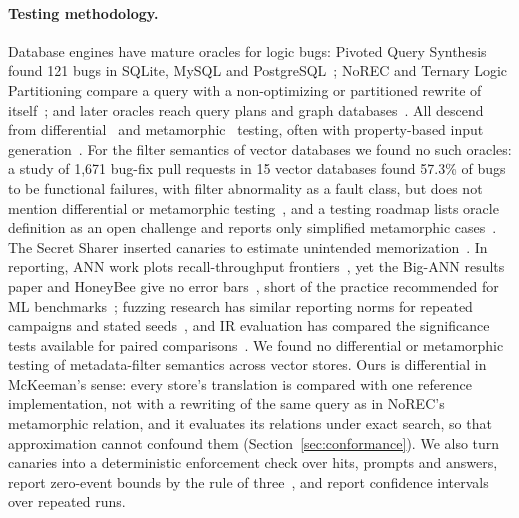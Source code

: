 \paragraph{Testing methodology.}
Database engines have mature oracles for logic bugs: Pivoted Query Synthesis found 121 bugs in
SQLite, MySQL and PostgreSQL~\cite{rigger2020testing}; NoREC and Ternary Logic Partitioning compare a
query with a non-optimizing or partitioned rewrite of itself~\cite{rigger2020detecting,rigger2020finding};
and later oracles reach query plans and graph databases~\cite{ba2023testing,ba2024keep,kamm2023testing}.
All descend from differential~\cite{mckeeman1998differential} and
metamorphic~\cite{chen2018metamorphic,segura2016survey} testing, often with property-based input
generation~\cite{claessen2000quickcheck,maciver2019hypothesis}. For the filter semantics of vector databases we found no such oracles:
a study of 1,671 bug-fix pull requests in 15 vector databases found 57.3\% of bugs to be functional
failures, with filter abnormality as a fault class, but does not mention differential or metamorphic
testing~\cite{xie2025toward}, and a testing roadmap lists oracle definition as an open
challenge and reports only simplified metamorphic cases~\cite{wang2025towards}. The Secret Sharer inserted canaries to estimate unintended
memorization~\cite{carlini2019secret}. In reporting, ANN work plots recall-throughput
frontiers~\cite{aumuller2020annbenchmarks}, yet the Big-ANN results paper and HoneyBee give no error
bars~\cite{simhadri2025results,zhong2026honeybee}, short of the practice recommended for ML
benchmarks~\cite{bouthillier2021accounting,agarwal2021deep}; fuzzing research has similar reporting
norms for repeated campaigns and stated seeds~\cite{klees2018evaluating,schloegel2024sok}, and IR
evaluation has compared the significance tests available for paired
comparisons~\cite{smucker2007comparison,urbano2019statistical}. We found no differential or metamorphic testing of metadata-filter semantics across vector stores. Ours is
differential in McKeeman's sense: every store's translation is compared with one reference
implementation, not with a rewriting of the same query as in NoREC's metamorphic relation, and it
evaluates its relations under exact search, so that approximation cannot confound them
(Section~\ref{sec:conformance}). We also turn canaries into a deterministic enforcement check over
hits, prompts and answers, report zero-event bounds by the rule of three~\cite{hanley1983if}, and
report confidence intervals over repeated runs.

